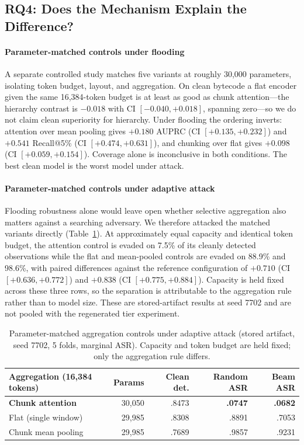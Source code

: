 \documentclass[conference]{IEEEtran}
\begin{document}
\subsection{RQ4: Does the Mechanism Explain the Difference?}
\label{sec:rq4}

\paragraph*{Parameter-matched controls under flooding} A separate controlled study matches five variants at roughly 30,000 parameters, isolating token budget, layout, and aggregation. On clean bytecode a flat encoder given the same 16,384-token budget is at least as good as chunk attention---the hierarchy contrast is $-0.018$ with CI $[-0.040,+0.018]$, spanning zero---so we do not claim clean superiority for hierarchy. Under flooding the ordering inverts: attention over mean pooling gives $+0.180$ AUPRC (CI $[+0.135,+0.232]$) and $+0.541$ Recall@5\% (CI $[+0.474,+0.631]$), and chunking over flat gives $+0.098$ (CI $[+0.059,+0.154]$). Coverage alone is inconclusive in both conditions. The best clean model is the worst model under attack.

\paragraph*{Parameter-matched controls under adaptive attack} Flooding robustness alone would leave open whether selective aggregation also matters against a searching adversary. We therefore attacked the matched variants directly (Table~\ref{tab:matched}). At approximately equal capacity and identical token budget, the attention control is evaded on 7.5\% of its cleanly detected observations while the flat and mean-pooled controls are evaded on 88.9\% and 98.6\%, with paired differences against the reference configuration of $+0.710$ (CI $[+0.636,+0.772]$) and $+0.838$ (CI $[+0.775,+0.884]$). Capacity is held fixed across these three rows, so the separation is attributable to the aggregation rule rather than to model size. These are stored-artifact results at seed 7702 and are not pooled with the regenerated tier experiment.

\begin{table}[t]
\centering
\caption{Parameter-matched aggregation controls under adaptive attack (stored artifact, seed 7702, 5 folds, marginal ASR). Capacity and token budget are held fixed; only the aggregation rule differs.}
\label{tab:matched}
\scriptsize
\setlength{\tabcolsep}{3pt}
\begin{tabular}{@{}lrrrr@{}}
\toprule
Aggregation (16{,}384 tokens) & Params & Clean det. & Random ASR & Beam ASR \\
\midrule
\textbf{Chunk attention} & 30{,}050 & .8473 & \textbf{.0747} & \textbf{.0682} \\
Flat (single window) & 29{,}985 & .8308 & .8891 & .7053 \\
Chunk mean pooling & 29{,}985 & .7689 & .9857 & .9231 \\
\bottomrule
\end{tabular}
\end{table}
\end{document}

